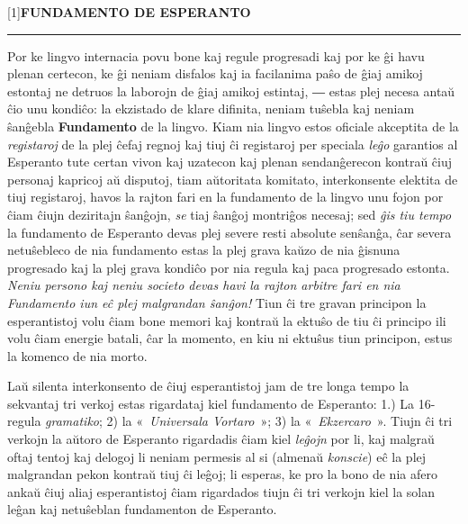 \label{antau}
\fancyhead[LE,RO]{\footnotesize\thepage}
\fancyhead[CE]{\footnotesize\narrow{\leftmark}}
\fancyhead[CO]{\footnotesize\narrow{\rightmark}}
\thispagestyle{plain}

\vspace*{1.35em}

\begin{center}

\scalebox{0.6}[1]{\Huge\bf FUNDAMENTO DE ESPERANTO}

\vspace{1em}

\rule{0.9\textwidth}{0.4pt}

\vspace{3em}

\Large{}
\end{center}
\vspace{1ex}

Por ke lingvo internacia povu bone kaj regule progresadi kaj por ke ĝi havu plenan certecon, ke ĝi neniam disfalos kaj ia facilanima paŝo de ĝiaj amikoj estontaj ne detruos la laborojn de ĝiaj amikoj estintaj, ― estas plej necesa antaŭ ĉio unu kondiĉo: la ekzistado de klare difinita, neniam tuŝebla kaj neniam ŝanĝebla \textbf{Fundamento} de la lingvo. Kiam nia lingvo estos oficiale akceptita de la \emph{registaroj} de la plej ĉefaj regnoj kaj tiuj ĉi registaroj per speciala \emph{leĝo} garantios al Esperanto tute certan vivon kaj uzatecon kaj plenan sendanĝerecon kontraŭ ĉiuj personaj kapricoj aŭ disputoj, tiam aŭtoritata komitato, interkonsente elektita de tiuj registaroj, havos la rajton fari en la fundamento de la lingvo unu fojon por ĉiam ĉiujn deziritajn ŝanĝojn, \emph{se} tiaj ŝanĝoj montriĝos necesaj; sed \emph{ĝis tiu tempo} la fundamento de Esperanto devas plej severe resti absolute senŝanĝa, ĉar severa netuŝebleco de nia fundamento estas la plej grava kaŭzo de nia ĝisnuna progresado kaj la plej grava kondiĉo por nia regula kaj paca progresado estonta. \emph{Neniu persono kaj neniu societo devas havi la rajton arbitre fari en nia Fundamento iun eĉ plej malgrandan ŝanĝon!} Tiun ĉi tre gravan principon la esperantistoj volu ĉiam bone memori kaj kontraŭ la ektuŝo de tiu ĉi principo ili volu ĉiam energie batali, ĉar la momento, en kiu ni ektuŝus tiun principon, estus la komenco de nia morto.

Laŭ silenta interkonsento de ĉiuj esperantistoj jam de tre longa tempo la sekvantaj tri verkoj estas rigardataj kiel fundamento de Esperanto: 1.) La 16-regula \emph{gramatiko}; 2) la «~\emph{Universala Vortaro}~»; 3) la «~\emph{Ekzercaro}~». Tiujn ĉi tri verkojn la aŭtoro de Esperanto rigardadis ĉiam kiel \emph{leĝojn} por li, kaj malgraŭ oftaj tentoj kaj delogoj li neniam permesis al si (almenaŭ \emph{konscie}) eĉ la plej malgrandan pekon kontraŭ tiuj ĉi leĝoj; li esperas, ke pro la bono de nia afero ankaŭ ĉiuj aliaj esperantistoj ĉiam rigardados tiujn ĉi tri verkojn kiel la solan leĝan kaj netuŝeblan fundamenton de Esperanto.

